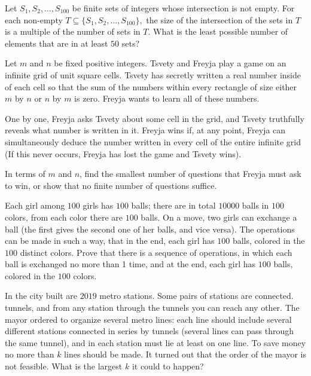 \documentclass[11pt]{scrartcl}
\begin{document}
\begin{problem}[1978345856029698287]
Let $S_1, S_2, \ldots, S_{100}$ be finite sets of integers whose intersection is not empty. For each non-empty $T \subseteq \{S_1, S_2, \ldots, S_{100}\},$ the size of the intersection of the sets in $T$ is a multiple of the number of sets in $T$. What is the least possible number of elements that are in at least $50$ sets?
\end{problem}
\begin{problem}[496656338551810]
Let $m$ and $n$ be fixed positive integers. Tsvety and Freyja play a game on an infinite grid of unit square cells. Tsvety has secretly written a real number inside of each cell so that the sum of the numbers within every rectangle of size either $m$ by $n$ or $n$ by $m$ is zero. Freyja wants to learn all of these numbers.

One by one, Freyja asks Tsvety about some cell in the grid, and Tsvety truthfully reveals what number is written in it. Freyja wins if, at any point, Freyja can simultaneously deduce the number written in every cell of the entire infinite grid (If this never occurs, Freyja has lost the game and Tsvety wins).

In terms of $m$ and $n$, find the smallest number of questions that Freyja must ask to win, or show that no finite number of questions suffice.

\end{problem}
\begin{problem}[969197144236847]
	Each girl among $100$ girls has $100$ balls; there are in total $10000$ balls in $100$ colors, from each color there are $100$ balls. On a move, two girls can exchange a ball (the first gives the second one of her balls, and vice versa). The operations can be made in such a way, that in the end, each girl has $100$ balls, colored in the $100$ distinct colors. Prove that there is a sequence of operations, in which each ball is exchanged no more than 1 time, and at the end, each girl has $100$ balls, colored in the $100$ colors.
\end{problem}
\begin{problem}[175452544956824]
In the city built are $2019$ metro stations. Some pairs of stations are connected. tunnels, and from any station through the tunnels you can reach any other. The mayor ordered to organize several metro lines: each line should include several different stations connected in series by tunnels (several lines can pass through the same tunnel), and in each station must lie at least on one line. To save money no more than $k$ lines should be made. It turned out that the order of the mayor is not feasible. What is the largest $k$ it could to happen?
\end{problem}
\end{document}
